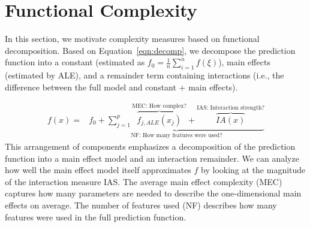 \documentclass[runningheads]{llncs}\usepackage[]{graphicx}\usepackage[]{color}
\newcommand{\falej}{f_{j,ALE}}                                        %
\begin{document}
\section{Functional Complexity}
\label{sec:measures}

In this section, we motivate complexity measures based on functional decomposition.
Based on Equation~\ref{eqn:decomp}, we decompose the prediction function into a constant (estimated as $f_0 = \frac{1}{n}\sum_{i=1}^n f(\xi)$), main effects (estimated by ALE), and a remainder term containing interactions (i.e., the difference between the full model and constant + main effects).

\begin{eqnarray} f(x) %
=&\underbrace{f_0 + \sum_{j=1}^p \overbrace{\falej(x_j)}^\text{MEC: How complex?} + \overbrace{IA(x)}^{\text{IAS: Interaction strength?}}}_{\text{NF: How many features were used?}}
\end{eqnarray}
This arrangement of components emphasizes a decomposition of the prediction function into a main effect model and an interaction remainder.
We can analyze how well the main effect model itself approximates $f$ by looking at the magnitude of the interaction measure IAS.
The average main effect complexity (MEC) captures how many parameters are needed to describe the one-dimensional main effects on average.
The number of features used (NF) describes how many features were used in the full prediction function.
\end{document}
